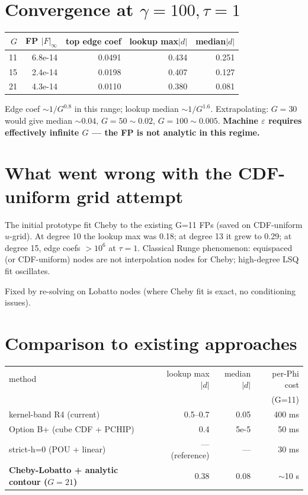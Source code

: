 \documentclass[11pt]{article}
\begin{document}
\section{Convergence at $\gamma{=}100, \tau{=}1$}

\begin{center}
\begin{tabular}{rrrrr}
\toprule
$G$ & FP $|F|_\infty$ & top edge coef & lookup max$|d|$ & median$|d|$ \\
\midrule
11 & 6.8e-14 & 0.0491 & 0.434 & 0.251 \\
15 & 2.4e-14 & 0.0198 & 0.407 & 0.127 \\
21 & 4.3e-14 & 0.0110 & 0.380 & 0.081 \\
\bottomrule
\end{tabular}
\end{center}

Edge coef $\sim 1/G^{0.8}$ in this range; lookup median $\sim 1/G^{1.6}$.
Extrapolating: $G{=}30$ would give median $\sim 0.04$, $G{=}50 \sim 0.02$,
$G{=}100 \sim 0.005$. \textbf{Machine $\varepsilon$ requires effectively
infinite $G$ --- the FP is not analytic in this regime.}

\section{What went wrong with the CDF-uniform grid attempt}

The initial prototype fit Cheby to the existing G=11 FPs (saved on
CDF-uniform $u$-grid). At degree 10 the lookup max was 0.18; at degree 13
it grew to 0.29; at degree 15, edge coefs $> 10^6$ at $\tau{=}1$. Classical
Runge phenomenon: equispaced (or CDF-uniform) nodes are not interpolation
nodes for Cheby; high-degree LSQ fit oscillates.

Fixed by re-solving on Lobatto nodes (where Cheby fit is exact, no
conditioning issues).

\section{Comparison to existing approaches}

\begin{center}
\begin{tabular}{lrrr}
\toprule
method & lookup max$|d|$ & median$|d|$ & per-Phi cost \\
       &                 &              & (G=11) \\
\midrule
kernel-band R4 (current) & 0.5--0.7 & 0.05 & 400 ms \\
Option B+ (cube CDF + PCHIP) & 0.4 & 5e-5 & 50 ms \\
strict-h=0 (POU + linear) & --- (reference) & --- & 30 ms \\
\textbf{Cheby-Lobatto + analytic contour ($G{=}21$)} & 0.38 & 0.08 & $\sim$10 s \\
\bottomrule
\end{tabular}
\end{center}
\end{document}
